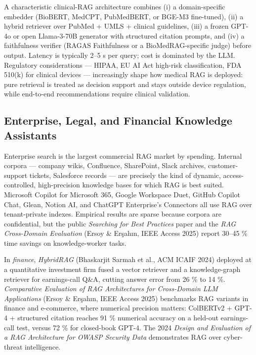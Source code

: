 \documentclass{article}
\begin{document}
A characteristic clinical-RAG architecture combines (i) a domain-specific embedder (BioBERT, MedCPT, PubMedBERT, or BGE-M3 fine-tuned), (ii) a hybrid retriever over PubMed + UMLS + clinical guidelines, (iii) a frozen GPT-4o or open Llama-3-70B generator with structured citation prompts, and (iv) a faithfulness verifier (RAGAS Faithfulness or a BioMedRAG-specific judge) before output. Latency is typically 2--5 s per query; cost is dominated by the LLM. Regulatory considerations --- HIPAA, EU AI Act high-risk classification, FDA 510(k) for clinical devices --- increasingly shape how medical RAG is deployed: pure retrieval is treated as decision support and stays outside device regulation, while end-to-end recommendations require clinical validation.

\subsection{Enterprise, Legal, and Financial Knowledge Assistants}\label{enterprise-legal-and-financial-knowledge-assistants}

Enterprise search is the largest commercial RAG market by spending. Internal corpora --- company wikis, Confluence, SharePoint, Slack archives, customer-support tickets, Salesforce records --- are precisely the kind of dynamic, access-controlled, high-precision knowledge bases for which RAG is best suited. Microsoft Copilot for Microsoft 365, Google Workspace Duet, GitHub Copilot Chat, Glean, Notion AI, and ChatGPT Enterprise's Connectors all use RAG over tenant-private indexes. Empirical results are sparse because corpora are confidential, but the public \emph{Searching for Best Practices} paper \citep{wang20242024} and the \emph{RAG Cross-Domain Evaluation} (Ersoy \& Erşahın, IEEE Access 2025) report 30--45 \% time savings on knowledge-worker tasks.

In \emph{finance}, \emph{HybridRAG} (Bhaskarjit Sarmah et al., ACM ICAIF 2024) deployed at a quantitative investment firm fused a vector retriever and a knowledge-graph retriever for earnings-call Q\&A, cutting answer error from 26 \% to 14 \%. \emph{Comparative Evaluation of RAG Architectures for Cross-Domain LLM Applications} (Ersoy \& Erşahın, IEEE Access 2025) benchmarks RAG variants in finance and e-commerce, where numerical precision matters: ColBERTv2 + GPT-4 + structured citation reaches 91 \% numerical accuracy on a held-out earnings-call test, versus 72 \% for closed-book GPT-4. The 2024 \emph{Design and Evaluation of a RAG Architecture for OWASP Security Data} \citep{es2024ragasautomatedeval} demonstrates RAG over cyber-threat intelligence.
\end{document}
